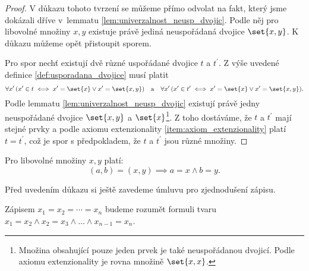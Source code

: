 \begin{proof}
    V důkazu tohoto tvrzení se můžeme přímo odvolat na fakt, který jsme dokázali dříve v~lemmatu \ref{lem:univerzalnost_neusp_dvojic}. Podle něj pro libovolné množiny $x,y$ existuje právě jediná neuspořádaná dvojice $\set{x,y}$. K důkazu můžeme opět přistoupit sporem.\par
    Pro spor nechť existují dvě různé uspořádané dvojice $t$ a $t^\prime$. Z výše uvedené definice \ref{def:usporadana_dvojice} musí platit
    \begin{equation*}
        \forall x^\prime\,(x^\prime\in t \iff x^\prime=\set{x} \lor x^\prime=\set{x,y})\quad\text{a}\quad \forall x^\prime\,(x^\prime\in t^\prime \iff x^\prime=\set{x} \lor x^\prime=\set{x,y}).
    \end{equation*}
    Podle lemmatu \ref{lem:univerzalnost_neusp_dvojic} existují právě jedny neuspořádané dvojice $\set{x,y}$ a $\set{x}$\footnote{Množina obsahující pouze jeden prvek je také neuspořádanou dvojicí. Podle axiomu extenzionality je rovna množině $\set{x,x}$.}. Z toho dostáváme, že $t$ a $t^\prime$ mají stejné prvky a podle axiomu extenzionality \ref{item:axiom_extenzionality} platí $t=t^\prime$, což je spor s předpokladem, že $t$ a $t^\prime$ jsou různé množiny.
\end{proof}
\begin{lemma}\label{lem:vlastnost_usp_dvojic}
    Pro libovolné množiny $x,y$ platí:
    \begin{equation*}
        (a,b)=(x,y) \implies a=x \land b=y.
    \end{equation*}
\end{lemma}
Před uvedením důkazu si ještě zavedeme úmluvu pro zjednodušení zápisu.
\begin{convention}
    Zápisem $x_1=x_2=\cdots=x_n$ budeme rozumět formuli tvaru $x_1=x_2 \land x_2=x_3 \land \dots \land x_{n-1}=x_n$.
\end{convention}
